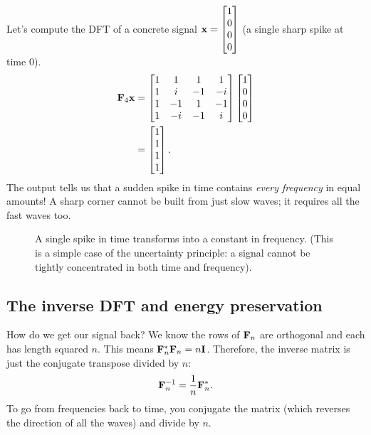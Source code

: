 Let's compute the DFT of a concrete signal $\mathbf{x} = \begin{bmatrix}1 \\ 0 \\ 0 \\ 0\end{bmatrix}$ (a single sharp spike at time 0).
\begin{align*}
  \mathbf{F}_4 \mathbf{x} &= \begin{bmatrix}
    1 & 1 & 1 & 1 \\
    1 & i & -1 & -i \\
    1 & -1 & 1 & -1 \\
    1 & -i & -1 & i
  \end{bmatrix} \begin{bmatrix}1 \\ 0 \\ 0 \\ 0\end{bmatrix} \\
  &= \begin{bmatrix}1 \\ 1 \\ 1 \\ 1\end{bmatrix}.
\end{align*}
The output tells us that a sudden spike in time contains \emph{every frequency} in equal amounts! A sharp corner cannot be built from just slow waves; it requires all the fast waves too.

\begin{figure}[htbp]
\centering
{}
\caption{A single spike in time transforms into a constant in frequency. (This is a simple case of the uncertainty principle: a signal cannot be tightly concentrated in both time and frequency).}
\label{ch32:spikeflat}
\end{figure}

\subsection{The inverse DFT and energy preservation}

How do we get our signal back? We know the rows of $\mathbf{F}_n$ are orthogonal and each has length squared $n$. This means $\mathbf{F}_n^* \mathbf{F}_n = n \mathbf{I}$. 
Therefore, the inverse matrix is just the conjugate transpose divided by $n$:
\[
  \mathbf{F}_n^{-1} = \frac{1}{n} \mathbf{F}_n^*.
\]
To go from frequencies back to time, you conjugate the matrix (which reverses the direction of all the waves) and divide by $n$.

